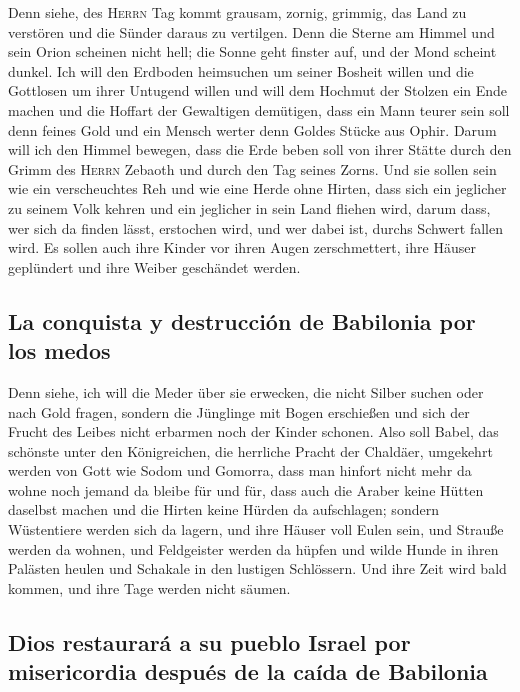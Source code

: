  Denn siehe, des \textsc{Herrn} Tag kommt grausam, zornig,
grimmig, das Land zu verstören und die Sünder daraus zu vertilgen.
 Denn die Sterne am Himmel und sein Orion scheinen nicht
hell; die Sonne geht finster auf, und der Mond scheint dunkel.
 Ich will den Erdboden heimsuchen um seiner Bosheit
willen und die Gottlosen um ihrer Untugend willen und will dem Hochmut
der Stolzen ein Ende machen und die Hoffart der Gewaltigen demütigen,
 dass ein Mann teurer sein soll denn feines Gold und ein
Mensch werter denn Goldes Stücke aus Ophir.  Darum will
ich den Himmel bewegen, dass die Erde beben soll von ihrer Stätte durch
den Grimm des \textsc{Herrn} Zebaoth und durch den Tag seines Zorns.
 Und sie sollen sein wie ein verscheuchtes Reh und wie
eine Herde ohne Hirten, dass sich ein jeglicher zu seinem Volk kehren
und ein jeglicher in sein Land fliehen wird,  darum dass,
wer sich da finden lässt, erstochen wird, und wer dabei ist, durchs
Schwert fallen wird.  Es sollen auch ihre Kinder vor
ihren Augen zerschmettert, ihre Häuser geplündert und ihre Weiber
geschändet werden.

\hypertarget{la-conquista-y-destrucciuxf3n-de-babilonia-por-los-medos}{%
\subsection{La conquista y destrucción de Babilonia por los
medos}\label{la-conquista-y-destrucciuxf3n-de-babilonia-por-los-medos}}

 Denn siehe, ich will die Meder über sie erwecken, die
nicht Silber suchen oder nach Gold fragen,  sondern die
Jünglinge mit Bogen erschießen und sich der Frucht des Leibes nicht
erbarmen noch der Kinder schonen.  Also soll Babel, das
schönste unter den Königreichen, die herrliche Pracht der Chaldäer,
umgekehrt werden von Gott wie Sodom und Gomorra,  dass
man hinfort nicht mehr da wohne noch jemand da bleibe für und für, dass
auch die Araber keine Hütten daselbst machen und die Hirten keine Hürden
da aufschlagen;  sondern Wüstentiere werden sich da
lagern, und ihre Häuser voll Eulen sein, und Strauße werden da wohnen,
und Feldgeister werden da hüpfen  und wilde Hunde in
ihren Palästen heulen und Schakale in den lustigen Schlössern. Und ihre
Zeit wird bald kommen, und ihre Tage werden nicht säumen.

\hypertarget{dios-restauraruxe1-a-su-pueblo-israel-por-misericordia-despuuxe9s-de-la-cauxedda-de-babilonia}{%
\subsection{Dios restaurará a su pueblo Israel por misericordia después
de la caída de
Babilonia}\label{dios-restauraruxe1-a-su-pueblo-israel-por-misericordia-despuuxe9s-de-la-cauxedda-de-babilonia}}

